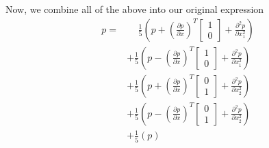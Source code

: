 Now, we combine all of the above into our original expression
\begin{align*}
    p =&\quad\, \frac{1}{5}\left(p + \left(\frac{\partial p}{\partial x}\right)^T \begin{bmatrix} 1\\0 \end{bmatrix} + \frac{\partial^2 p}{\partial x_1^2}\right)\\
    &+\frac{1}{5}\left(p - \left(\frac{\partial p}{\partial x}\right)^T \begin{bmatrix} 1\\0 \end{bmatrix} + \frac{\partial^2 p}{\partial x_1^2}\right)\\
    &+\frac{1}{5}\left(p + \left(\frac{\partial p}{\partial x}\right)^T \begin{bmatrix} 0\\1 \end{bmatrix} + \frac{\partial^2 p}{\partial x_2^2}\right)\\
    &+\frac{1}{5}\left(p - \left(\frac{\partial p}{\partial x}\right)^T \begin{bmatrix} 0\\1 \end{bmatrix} + \frac{\partial^2 p}{\partial x_2^2}\right)\\
    &+\frac{1}{5}\left(p\right)
\end{align*}
